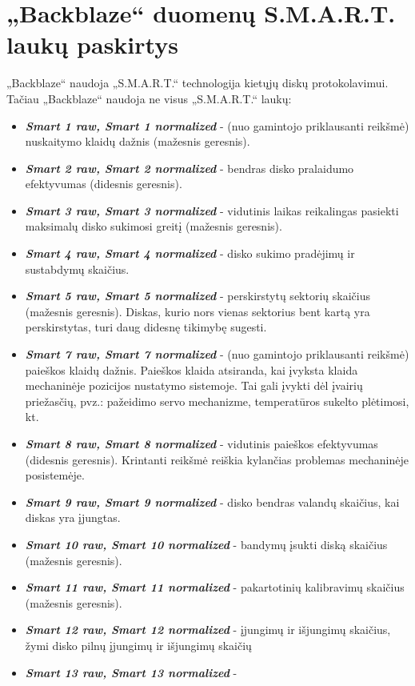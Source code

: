 \documentclass{VUMIFPSkursinis}
\begin{document}
\section{„Backblaze“ duomenų S.M.A.R.T. laukų paskirtys} \label{sec:smart}
„Backblaze“ naudoja „S.M.A.R.T.“ technologija kietųjų diskų protokolavimui. Tačiau „Backblaze“ naudoja ne visus „S.M.A.R.T.“ laukų:
\begin{itemize}
\item \textit{\textbf{Smart 1 raw, Smart 1 normalized}} - (nuo gamintojo priklausanti reikšmė) nuskaitymo klaidų dažnis (mažesnis geresnis).
\item \textit{\textbf{Smart 2 raw, Smart 2 normalized}} - bendras disko pralaidumo efektyvumas (didesnis geresnis).
\item \textit{\textbf{Smart 3 raw, Smart 3 normalized}} - vidutinis laikas reikalingas pasiekti maksimalų disko sukimosi greitį (mažesnis geresnis).
\item \textit{\textbf{Smart 4 raw, Smart 4 normalized}} - disko sukimo pradėjimų ir sustabdymų skaičius.
\item \textit{\textbf{Smart 5 raw, Smart 5 normalized}} - perskirstytų sektorių skaičius (mažesnis geresnis). Diskas, kurio nors vienas sektorius bent kartą yra perskirstytas, turi daug didesnę tikimybę sugesti.
\item \textit{\textbf{Smart 7 raw, Smart 7 normalized}} - (nuo gamintojo priklausanti reikšmė) paieškos klaidų dažnis. Paieškos klaida atsiranda, kai įvyksta klaida mechaninėje pozicijos nustatymo sistemoje. Tai gali įvykti dėl įvairių priežasčių, pvz.: pažeidimo servo mechanizme, temperatūros sukelto plėtimosi, kt.
\item \textit{\textbf{Smart 8 raw, Smart 8 normalized}} - vidutinis paieškos efektyvumas (didesnis geresnis). Krintanti reikšmė reiškia kylančias problemas mechaninėje posistemėje.
\item \textit{\textbf{Smart 9 raw, Smart 9 normalized}} - disko bendras valandų skaičius, kai diskas yra įjungtas.
\item \textit{\textbf{Smart 10 raw, Smart 10 normalized}} - bandymų įsukti diską skaičius (mažesnis geresnis).
\item \textit{\textbf{Smart 11 raw, Smart 11 normalized}} - pakartotinių kalibravimų skaičius (mažesnis geresnis).
\item \textit{\textbf{Smart 12 raw, Smart 12 normalized}} - įjungimų ir išjungimų skaičius, žymi disko pilnų įjungimų ir išjungimų skaičių
\item \textit{\textbf{Smart 13 raw, Smart 13 normalized}} - 

\end{itemize}
\end{document}
